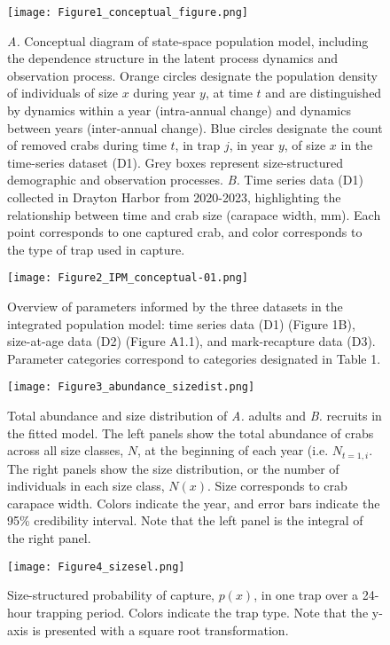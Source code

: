 \documentclass{article}
\begin{document}
\begin{figure}[H]
    \centering
    \texttt{[image: Figure1\_conceptual\_figure.png]}
    \caption{\textit{A.} Conceptual diagram of state-space population model, including the dependence structure in the latent process dynamics and observation process. Orange circles designate the population density of individuals of size $x$ during year $y$, at time $t$ and are distinguished by dynamics within a year (intra-annual change) and dynamics between years (inter-annual change). Blue circles designate the count of removed crabs during time $t$, in trap $j$, in year $y$, of size $x$ in the time-series dataset (D1). Grey boxes represent size-structured demographic and observation processes. \textit{B.} Time series data (D1) collected in Drayton Harbor from 2020-2023, highlighting the relationship between time and crab size (carapace width, mm). Each point corresponds to one captured crab, and color corresponds to the type of trap used in capture.}
\end{figure}

\begin{figure}[H]
    \centering
    \texttt{[image: Figure2\_IPM\_conceptual-01.png]}
    \caption{Overview of parameters informed by the three datasets in the integrated population model: time series data (D1) (Figure 1B), size-at-age data (D2) (Figure A1.1), and mark-recapture data (D3). Parameter categories correspond to categories designated in Table 1.}
\end{figure}

\begin{figure}[H]
    \centering
    \texttt{[image: Figure3\_abundance\_sizedist.png]}
    \caption{Total abundance and size distribution of \textit{A.} adults and \textit{B.} recruits in the fitted model. The left panels show the total abundance of crabs across all size classes, $N$, at the beginning of each year (i.e. $N_{t=1, i}$. The right panels show the size distribution, or the number of individuals in each size class, $N(x)$. Size corresponds to crab carapace width. Colors indicate the year, and error bars indicate the 95\% credibility interval. Note that the left panel is the integral of the right panel.}
\end{figure}

\begin{figure}[H]
    \centering
    \texttt{[image: Figure4\_sizesel.png]}
    \caption{Size-structured probability of capture, $p(x)$, in one trap over a 24-hour trapping period. Colors indicate the trap type. Note that the y-axis is presented with a square root transformation.}
\end{figure}
\end{document}
